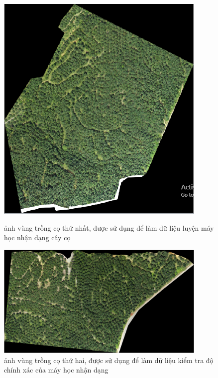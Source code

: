 \documentclass[14pt, oneside, a4paper, openany]{scrartcl}
\begin{document}
\begin{figure}[!h]
	\centering
	\begin{minipage}{0.45\textwidth}
		\centering
		\includegraphics[width=0.9\textwidth]{figures/data02.png} %
		\caption[ảnh vùng trồng cọ thứ nhất]{ảnh vùng trồng cọ thứ nhất, được sử dụng để làm dữ liệu luyện máy học nhận dạng cây cọ}
	\end{minipage}\hfill
	\begin{minipage}{0.45\textwidth}
		\centering
		\includegraphics[width=0.9\textwidth]{figures/data01.png} %
		\caption[ảnh vùng trồng cọ thứ hai]{ảnh vùng trồng cọ thứ hai, được sử dụng để làm dữ liệu kiểm tra độ chính xác của máy học nhận dạng}
	\end{minipage}
\end{figure}
\end{document}
